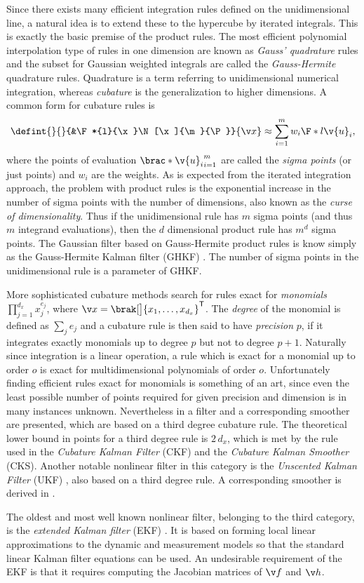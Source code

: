 Since there exists many efficient integration rules defined on the unidimensional line,
a natural idea is to extend these to the hypercube by iterated integrals. This is exactly the 
basic premise of the product rules. The most efficient polynomial interpolation type of rules
in one dimension are known as \emph{Gauss' quadrature} rules and the subset
for Gaussian weighted integrals are called the \emph{Gauss-Hermite}
quadrature rules. Quadrature is a term referring to unidimensional numerical integration, whereas
\emph{cubature} is the generalization to higher dimensions. A common form for cubature rules is
\begin{align}
	\defint{}{}{&\F*{l}{\x}\N[\x]{\m}{\P}}{\x} \approx \sum_{i=1}^m w_i\F*{l}{\v{u}_i}, 
\end{align}
where the points of evaluation $\brac*{\v{u}_i}_{i=1}^m$ are called the \emph{sigma points}
(or just points) and $w_i$ are the weights. As is expected from the iterated integration approach,
the problem with product rules is the exponential increase in the number of sigma points with
the number of dimensions, also known as the \emph{curse of dimensionality}. Thus if the unidimensional rule has $m$ sigma points (and thus $m$ integrand evaluations),
then the $d$ dimensional product rule has $m^d$ sigma points. The Gaussian filter based
on Gauss-Hermite product rules is know simply as the Gauss-Hermite Kalman filter (GHKF) \parencite{Ito2000}.
The number of sigma points in the unidimensional rule is a parameter of GHKF.

More sophisticated cubature methods search for rules
exact for \emph{monomials} $\prod_{j=1}^{d_x} x_j^{e_j}$, where $\x=\brak[\big]{x_1,\dots,x_{d_x}}^\tr$. 
The \emph{degree} of the monomial is defined as $\sum_j e_j$ and a cubature rule is then said to have
\emph{precision} $p$, if it integrates exactly monomials up to degree $p$ but not
to degree $p+1$. Naturally since integration is a linear operation, a rule which is exact 
for a monomial up to order $o$ is exact for multidimensional polynomials of order $o$.
Unfortunately finding efficient rules exact for monomials is something of an art, since
even the least possible number of points required for given precision and dimension is in many
instances unknown. Nevertheless in \textcite{Arasaratnam2009,Arasaratnam2011} a filter
and a corresponding smoother are presented, which are based on a third degree 
cubature rule. The theoretical lower bound in points for a third degree rule
is $2\,d_x$, which is met by the rule used in the \emph{Cubature Kalman Filter} (CKF) and
the \emph{Cubature Kalman Smoother} (CKS). Another notable nonlinear filter in this
category is the \emph{Unscented Kalman Filter} (UKF) \textcite{julier1997new,Merwe2004}, 
also based on a third degree rule. A corresponding smoother is derived in \textcite{Sarkka2008a}.

The oldest and most well known nonlinear filter, belonging to the third category, is
the \emph{extended Kalman filter} (EKF) \parencite{jazwinski2007stochastic}. 
It is based on forming local linear approximations to the dynamic
and measurement models so that the standard linear Kalman filter equations can be used.
An undesirable requirement of the EKF is that it requires computing
the Jacobian matrices of $\f$ and $\h$.

